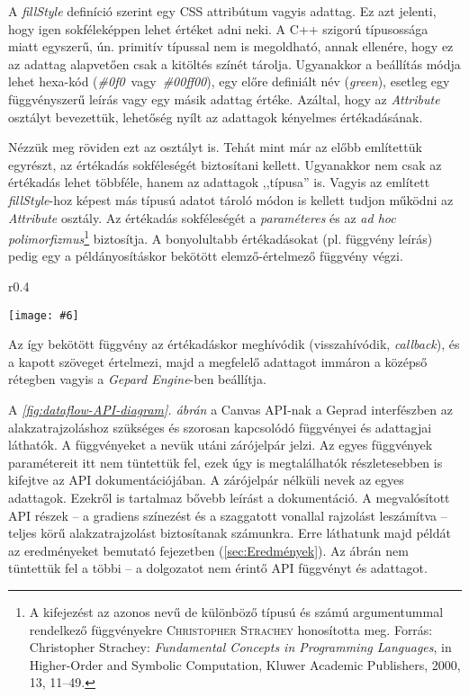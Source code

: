 \documentclass[12pt]{report}
\makeatletter
\theoremstyle{definition}
\newcommand{\inenglish}[1]{\textsl{#1}}
\newcommand{\func}[1]{{\textsl{#1}}}
\newcommand{\melyikoldalra}{r}
\newlength{\Xoffset}
\newlength{\Yoffset}
\newcommand*{\setpdfoffset}[2]{%
  \setlength{\Xoffset}{#1}%
  \setlength{\Yoffset}{#2}%
}
\newcommand*{\setviewport}[4]{%
  \def\x@viewport{%
    {\the\dimexpr#1-\Xoffset}
    {\the\dimexpr#2-\Yoffset}
    {\the\dimexpr#3-\Xoffset}
    {\the\dimexpr#4-\Yoffset}%
  }%
}
\newcommand{\includegraphicskivagas}[6]{
    \setpdfoffset{0pt}{0pt}
    \setviewport{#1}{#2}{#3}{#4}
    \texttt{[image: \#6]}
}
\newcommand{\includedataflowkivagas}[5]{
    \includegraphicskivagas{#1}{#2}{#3}{#4}{scale=0.6,#5}
    {img/built/dataflow_eps}
}
\makeatother
\begin{document}
A \func{fillStyle} definíció szerint egy CSS attribútum vagyis adattag. Ez azt
jelenti, hogy igen sokféleképpen lehet értéket adni neki. A C++ szigorú
típusossága miatt egyszerű, ún. primitív típussal nem is megoldható, annak
ellenére, hogy ez az adattag alapvetően csak a kitöltés színét tárolja.
Ugyanakkor a beállítás módja lehet hexa-kód
(\func{\#0f0}~vagy~\func{\#00ff00}), egy előre definiált név (\func{green}),
esetleg egy függvényszerű leírás vagy egy másik adattag értéke. Azáltal, hogy
az \func{Attribute} osztályt bevezettük, lehetőség nyílt az adattagok kényelmes
értékadásának.

Nézzük meg röviden ezt az osztályt is. Tehát mint már az előbb említettük
egyrészt, az értékadás sokféleségét biztosítani kellett. Ugyanakkor nem csak az
értékadás lehet többféle, hanem az adattagok ,,típusa'' is. Vagyis az említett
\func{fillStyle}-hoz képest más típusú adatot tároló módon is kellett tudjon
működni az \func{Attribute} osztály. Az értékadás sokféleségét a
\emph{paraméteres} és az \emph{ad hoc polimorfizmus}\footnote{ A kifejezést az
azonos nevű de különböző típusú és számú argumentummal rendelkező függvényekre
\textsc{Christopher Strachey} honosította meg. Forrás: Christopher Strachey:
\emph{Fundamental Concepts in Programming Languages}, in Higher-Order and
Symbolic Computation, Kluwer Academic Publishers, 2000, 13, 11–49.} biztosítja.
A bonyolultabb értékadásokat (pl. függvény leírás) pedig egy a példányosításkor
bekötött elemző-értelmező függvény végzi.
  \begin{wrapfigure}{\melyikoldalra}{0.4\textwidth}
    \begin{center}
      \includedataflowkivagas{0pt}{210pt}{160pt}{590pt}{}
    \end{center}
    \caption{\label{fig:dataflow-API-diagram} A \emph{felső} réteg (Gepard
    interfész) függvényei és adattagjai \\ (Részlet az
    \emph{\ref{appendix:dataflow}. folyamatábrából}.)}
  \end{wrapfigure}
Az így bekötött függvény az értékadáskor meghívódik (visszahívódik,
\inenglish{callback}), és a kapott szöveget értelmezi, majd a megfelelő
adattagot immáron a középső rétegben vagyis a \func{Gepard Engine}-ben
beállítja.

A \emph{\ref{fig:dataflow-API-diagram}. ábrán} a Canvas API-nak a Geprad
interfészben az alakzatrajzoláshoz szükséges és szorosan kapcsolódó függvényei
és adattagjai láthatók. A függvényeket a nevük utáni zárójelpár jelzi. Az egyes
függvények paramétereit itt nem tüntettük fel, ezek úgy is megtalálhatók
részletesebben is kifejtve az API dokumentációjában. A zárójelpár nélküli nevek
az egyes adattagok. Ezekről is tartalmaz bővebb leírást a dokumentáció. A
megvalósított API részek -- a gradiens színezést és a szaggatott vonallal
rajzolást leszámítva -- teljes körű alakzatrajzolást biztosítanak számunkra.
Erre láthatunk majd példát az eredményeket bemutató fejezetben
(\ref{sec:Eredmények}). Az ábrán nem tüntettük fel a többi -- a dolgozatot nem
érintő API függvényt és adattagot.
\end{document}
